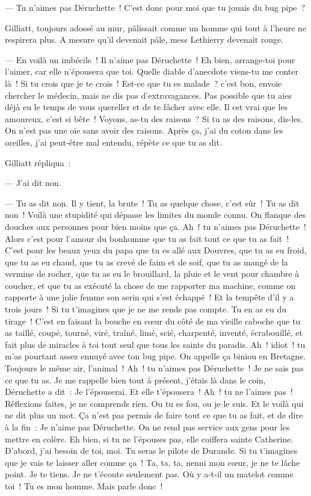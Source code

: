 \documentclass[french,twoside]{book} %
\begin{document}
 — Tu n’aimes pas Déruchette ! C’est donc pour moi que tu jouais du bug pipe ?\par
Gilliatt, toujours adossé au mur, pâlissait comme un homme qui tout à l’heure ne respirera plus. A mesure qu’il devenait pâle, mess Lethierry devenait rouge.\par
— En voilà un imbécile ! Il n’aime pas Déruchette ! Eh bien, arrange-toi pour l’aimer, car elle n’épousera que toi. Quelle diable d’anecdote viens-tu me conter là ! Si tu crois que je te crois ! Est-ce que tu es malade ? c’est bon, envoie chercher le médecin, mais ne dis pas d’extravagances. Pas possible que tu aies déjà eu le temps de vous quereller et de te fâcher avec elle. Il est vrai que les amoureux, c’est si bête ! Voyons, as-tu des raisons ? Si tu as des raisons, dis-les. On n’est pas une oie sans avoir des raisons. Après ça, j’ai du coton dans les oreilles, j’ai peut-être mal entendu, répète ce que tu as dit.\par
Gilliatt répliqua :\par
— J’ai dit non.\par
— Tu as dit non. Il y tient, la brute ! Tu as quelque chose, c’est sûr ! Tu as dit non ! Voilà une stupidité qui dépasse les limites du monde connu. On flanque des douches aux personnes pour bien moins que ça. Ah ! tu n’aimes pas Déruchette ! Alors c’est pour l’amour du bonhomme que tu as fait tout ce que tu as fait ! C’est pour les beaux yeux du papa que tu es allé aux Douvres, que tu as eu froid, que tu as eu chaud, que tu as crevé de faim et de soif, que tu as mangé de la vermine de rocher, que tu as eu le brouillard, la pluie et le vent pour chambre à coucher, et que tu as exécuté la chose  de me rapporter ma machine, comme on rapporte à une jolie femme son serin qui s’est échappé ! Et la tempête d’il y a trois jours ! Si tu t’imagines que je ne me rends pas compte. Tu en as eu du tirage ! C’est en faisant la bouche en cœur du côté de ma vieille caboche que tu as taillé, coupé, tourné, viré, traîné, limé, scié, charpenté, inventé, écrabouillé, et fait plus de miracles à toi tout seul que tous les saints du paradis. Ah ! idiot ! tu m’as pourtant assez ennuyé avec ton bug pipe. On appelle ça biniou en Bretagne. Toujours le même air, l’animal ! Ah ! tu n’aimes pas Déruchette ! Je ne sais pas ce que tu as. Je me rappelle bien tout à présent, j’étais là dans le coin, Déruchette a dit : Je l’épouserai. Et elle t’épousera ! Ah ! tu ne l’aimes pas ! Réflexions faites, je ne comprends rien. Ou tu es fou, ou je le suis. Et le voilà qui ne dit plus un mot. Ça n’est pas permis de faire tout ce que tu as fait, et de dire à la fin : Je n’aime pas Déruchette. On ne rend pas service aux gens pour les mettre en colère. Eh bien, si tu ne l’épouses pas, elle coiffera sainte Catherine. D’abord, j’ai besoin de toi, moi. Tu seras le pilote de Durande. Si tu t’imagines que je vais te laisser aller comme ça ! Ta, ta, ta, nenni mon cœur, je ne te lâche point. Je te tiens. Je ne t’écoute seulement pas. Où y a-t-il un matelot comme toi ! Tu es mon homme. Mais parle donc !\par
\end{document}
